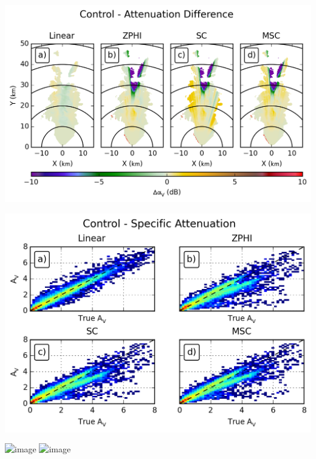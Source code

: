 \documentclass[red]{beamer}
\begin{document}
\begin{frame}
    \begin{center}
        \includegraphics[scale=0.7]{figures/X_Control_Attenuation_Difference_V}
    \end{center}
\end{frame}

\begin{frame}
    \begin{center}
        \includegraphics[scale=0.7]{figures/X_Control_Specific_Attenuation_V_scatter}
    \end{center}
\end{frame}

\begin{frame}
    \begin{center}
        \includegraphics<1>[scale=0.7]{figures/C_Canting_Attenuation_V}
        \includegraphics<2>[scale=0.7]{figures/C_Control_Attenuation_V}
    \end{center}
\end{frame}
\end{document}
